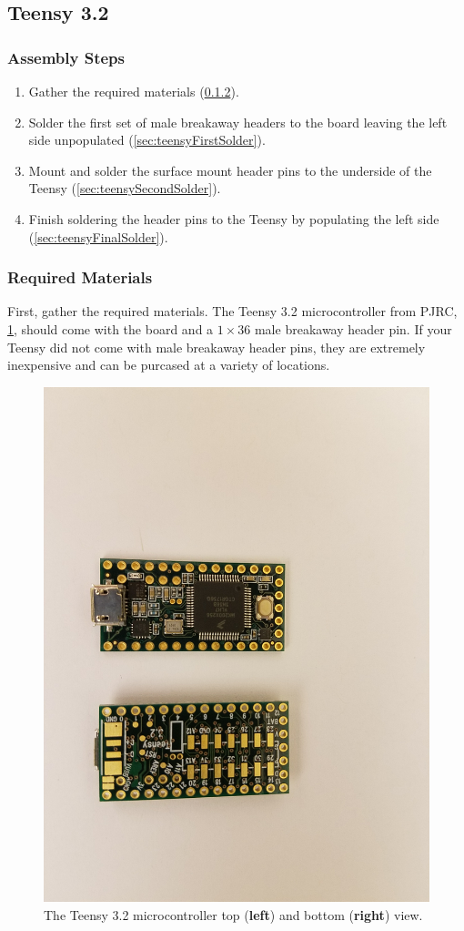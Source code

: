  \subsection{Teensy 3.2}
 
 \subsubsection{Assembly Steps}
 
 \begin{enumerate}
 \item Gather the required materials (\cref{sec:teensyMaterials}).
 \item Solder the first set of male breakaway headers to the board leaving the left side unpopulated (\cref{sec:teensyFirstSolder}). 
 \item Mount and solder the surface mount header pins to the underside of the Teensy (\cref{sec:teensySecondSolder}).
 \item Finish soldering the header pins to the Teensy by populating the left side (\cref{sec:teensyFinalSolder}).
 \end{enumerate}
 
 \subsubsection{Required Materials}
 \label{sec:teensyMaterials}
 
 First, gather the required materials. The Teensy 3.2 microcontroller from PJRC, \cref{fig:teensyTB}, should come with the board and a $1 \times 36$ male breakaway header pin. If your Teensy did not come with male breakaway header pins, they are extremely inexpensive and can be purcased at a variety of locations.
 
\begin{figure}[h!]
\centering
\includegraphics[trim={15cm 0 0 10cm},clip=true,width=0.65\columnwidth, keepaspectratio]{./figs/20181119_151744.jpg}
\caption{The Teensy 3.2 microcontroller top (\textbf{left}) and bottom (\textbf{right}) view.}
\label{fig:teensyTB}
\end{figure}
 
